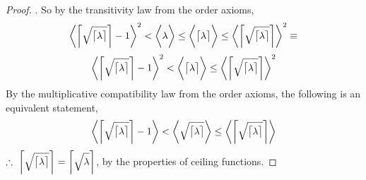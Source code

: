 \documentclass[preview]{standalone}
\begin{document}
\begin{proof}
    .
    So by the transitivity law from the order axioms,
    \begin{equation*}
        \bigg \langle
            \bigg \lceil
                \sqrt{ \strut \big \lceil \lambda \big \rceil }
            \bigg \rceil
                -
            1
        \bigg \rangle
            ^2
            <
        \bigg \langle
            \lambda
        \bigg \rangle
            \leq
        \bigg \langle
            \big \lceil \lambda \big \rceil
        \bigg \rangle
            \leq
        \bigg \langle
            \bigg \lceil
                \sqrt{ \strut \big \lceil \lambda \big \rceil }
            \bigg \rceil
        \bigg \rangle
            ^2
            \equiv
    \end{equation*}
    \begin{equation*}
        \bigg \langle
            \bigg \lceil
                \sqrt{ \strut \big \lceil \lambda \big \rceil }
            \bigg \rceil
                -
            1
        \bigg \rangle
            ^2
            <
        \bigg \langle
            \big \lceil \lambda \big \rceil
        \bigg \rangle
            \leq
        \bigg \langle
            \bigg \lceil
                \sqrt{ \strut \big \lceil \lambda \big \rceil }
            \bigg \rceil
        \bigg \rangle
            ^2
    \end{equation*}
    By the multiplicative compatibility law from the order axioms,
    the following is an equivalent statement,
    \begin{equation*}
        \bigg \langle
            \bigg \lceil
                \sqrt{ \strut \big \lceil \lambda \big \rceil }
            \bigg \rceil
                -
            1
        \bigg \rangle
            <
        \bigg \langle
            \sqrt{ \strut \big \lceil \lambda \big \rceil }
        \bigg \rangle
            \leq
        \bigg \langle
            \bigg \lceil
                \sqrt{ \strut \big \lceil \lambda \big \rceil }
            \bigg \rceil
        \bigg \rangle
    \end{equation*}
    $\therefore \text{\space} \relax{
        \bigg \lceil 
            \sqrt{ \strut \big \lceil \lambda \big \rceil }
        \bigg \rceil 
            = 
        \bigg \lceil \sqrt{ \strut \lambda } \bigg \rceil
    }$, by the properties of ceiling functions.
\end{proof}
\end{document}
